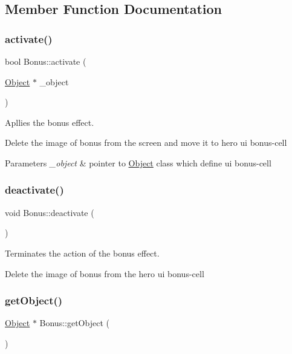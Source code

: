 \subsection{Member Function Documentation}
\mbox{\label{class_bonus_a78f64b402daa7593afb28b78baf6d15e}} 
\subsubsection{\texorpdfstring{activate()}{activate()}}
{\footnotesize\ttfamily bool Bonus\+::activate (\begin{DoxyParamCaption}\item[{\hyperlink{class_object}{Object} $\ast$}]{\+\_\+object }\end{DoxyParamCaption})}



Apllies the bonus effect. 

Delete the image of bonus from the screen and move it to hero ui bonus-\/cell 
\begin{DoxyParams}{Parameters}
{\em \+\_\+object} & pointer to \hyperlink{class_object}{Object} class which define ui bonus-\/cell \\
\hline
\end{DoxyParams}
\mbox{\label{class_bonus_a52875b799a9937f5c398f8f95d9ead98}} 
\subsubsection{\texorpdfstring{deactivate()}{deactivate()}}
{\footnotesize\ttfamily void Bonus\+::deactivate (\begin{DoxyParamCaption}{ }\end{DoxyParamCaption})}



Terminates the action of the bonus effect. 

Delete the image of bonus from the hero ui bonus-\/cell \mbox{\label{class_bonus_a5964466dfbb4b4e3e7d3eafcb9dae7db}} 
\subsubsection{\texorpdfstring{get\+Object()}{getObject()}}
{\footnotesize\ttfamily \hyperlink{class_object}{Object} $\ast$ Bonus\+::get\+Object (\begin{DoxyParamCaption}{ }\end{DoxyParamCaption})}

